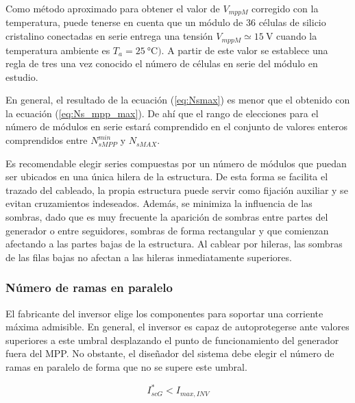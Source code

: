 Como método aproximado para obtener el valor de $V_{mppM}$ corregido
con la temperatura, puede tenerse en cuenta que un módulo de 36 células
de silicio cristalino conectadas en serie entrega una tensión $V_{mppM}\simeq\SI{15}{\volt}$
cuando la temperatura ambiente es $T_{a}=\SI{25}{\celsius})$. A partir
de este valor se establece una regla de tres una vez conocido el número
de células en serie del módulo en estudio. 

En general, el resultado de la ecuación (\ref{eq:Nsmax}) es menor que
el obtenido con la ecuación (\ref{eq:Ns_mpp_max}). De ahí que el rango
de elecciones para el número de módulos en serie estará comprendido en
el conjunto de valores enteros comprendidos entre $N_{sMPP}^{min}$ y $N_{sMAX}$.

Es recomendable elegir series compuestas por un número de módulos
que puedan ser ubicados en una única hilera de la estructura. De esta
forma se facilita el trazado del cableado, la propia estructura puede
servir como fijación auxiliar y se evitan cruzamientos indeseados.
Además, se minimiza la influencia de las sombras, dado que es muy
frecuente la aparición de sombras entre partes del generador o entre
seguidores, sombras de forma rectangular y que comienzan afectando
a las partes bajas de la estructura. Al cablear por hileras, las sombras
de las filas bajas no afectan a las hileras inmediatamente superiores.

\subsubsection{Número de ramas en paralelo}
\label{sec:Np}

El fabricante del inversor elige los componentes para soportar una
corriente máxima admisible. En general, el inversor es capaz de autoprotegerse
ante valores superiores a este umbral desplazando el punto de funcionamiento
del generador fuera del MPP. No obstante, el diseñador del sistema
debe elegir el número de ramas en paralelo de forma que no se supere
este umbral.

\begin{equation}
I_{scG}^{*}<I_{max,INV}\end{equation}

